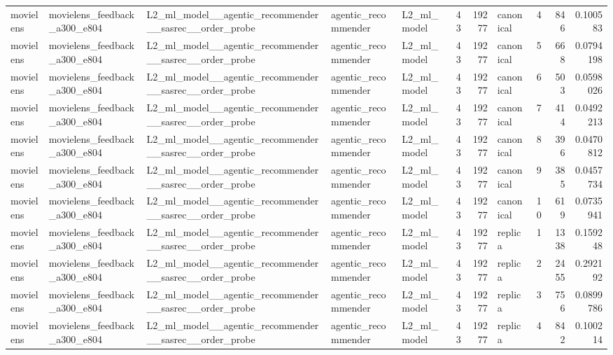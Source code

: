 \begin{table}[htbp!]
\begin{tabular}{lllllrrlrrr}
movielens & movielens\_feedback\_a300\_e804 & L2\_ml\_model\_\_agentic\_recommender\_\_sasrec\_\_order\_probe & agentic\_recommender & L2\_ml\_model & 43 & 19277 & canonical & 4 & 846 & 0.100583 \\
movielens & movielens\_feedback\_a300\_e804 & L2\_ml\_model\_\_agentic\_recommender\_\_sasrec\_\_order\_probe & agentic\_recommender & L2\_ml\_model & 43 & 19277 & canonical & 5 & 668 & 0.0794198 \\
movielens & movielens\_feedback\_a300\_e804 & L2\_ml\_model\_\_agentic\_recommender\_\_sasrec\_\_order\_probe & agentic\_recommender & L2\_ml\_model & 43 & 19277 & canonical & 6 & 503 & 0.0598026 \\
movielens & movielens\_feedback\_a300\_e804 & L2\_ml\_model\_\_agentic\_recommender\_\_sasrec\_\_order\_probe & agentic\_recommender & L2\_ml\_model & 43 & 19277 & canonical & 7 & 414 & 0.0492213 \\
movielens & movielens\_feedback\_a300\_e804 & L2\_ml\_model\_\_agentic\_recommender\_\_sasrec\_\_order\_probe & agentic\_recommender & L2\_ml\_model & 43 & 19277 & canonical & 8 & 396 & 0.0470812 \\
movielens & movielens\_feedback\_a300\_e804 & L2\_ml\_model\_\_agentic\_recommender\_\_sasrec\_\_order\_probe & agentic\_recommender & L2\_ml\_model & 43 & 19277 & canonical & 9 & 385 & 0.0457734 \\
movielens & movielens\_feedback\_a300\_e804 & L2\_ml\_model\_\_agentic\_recommender\_\_sasrec\_\_order\_probe & agentic\_recommender & L2\_ml\_model & 43 & 19277 & canonical & 10 & 619 & 0.0735941 \\
movielens & movielens\_feedback\_a300\_e804 & L2\_ml\_model\_\_agentic\_recommender\_\_sasrec\_\_order\_probe & agentic\_recommender & L2\_ml\_model & 43 & 19277 & replica & 1 & 1338 & 0.159248 \\
movielens & movielens\_feedback\_a300\_e804 & L2\_ml\_model\_\_agentic\_recommender\_\_sasrec\_\_order\_probe & agentic\_recommender & L2\_ml\_model & 43 & 19277 & replica & 2 & 2455 & 0.292192 \\
movielens & movielens\_feedback\_a300\_e804 & L2\_ml\_model\_\_agentic\_recommender\_\_sasrec\_\_order\_probe & agentic\_recommender & L2\_ml\_model & 43 & 19277 & replica & 3 & 756 & 0.0899786 \\
movielens & movielens\_feedback\_a300\_e804 & L2\_ml\_model\_\_agentic\_recommender\_\_sasrec\_\_order\_probe & agentic\_recommender & L2\_ml\_model & 43 & 19277 & replica & 4 & 842 & 0.100214 \\

\end{tabular}
\end{table}

